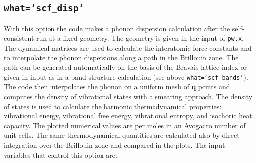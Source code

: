 \documentclass[12pt,a4paper]{article}
\begin{document}
\subsection{\texttt{what='scf\_disp'}}
With this option the code makes a phonon dispersion calculation after the 
self-consistent run at a fixed geometry. The geometry is given in the 
input of \texttt{pw.x}. The dynamical matrices are used to calculate 
the interatomic force constants and to interpolate the phonon dispersions 
along a path in the Brillouin zone. The path can be generated automatically 
on the basis of the Bravais lattice index or given in input as in a band 
structure calculation (see above \texttt{what='scf\_bands'}). The code then 
interpolates the phonon on a uniform mesh of {\bf q} points and computes the 
density of vibrational states with a smearing approach. The density of 
states is used to calculate the harmonic thermodynamical properties: 
vibrational energy, vibrational free energy, vibrational entropy, and 
isochoric heat capacity.
The plotted numerical values are per moles in an Avogadro number of unit 
cells. The same thermodynamical quantities are calculated also by direct 
integration over the Brillouin zone and compared in the plots.
The input variables that control this option are:
\end{document}
